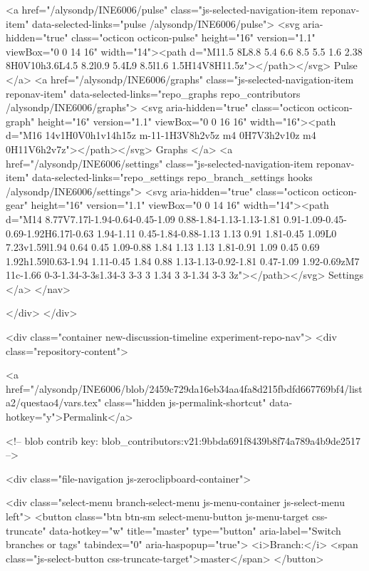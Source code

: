   <a href="/alysondp/INE6006/pulse" class="js-selected-navigation-item reponav-item" data-selected-links="pulse /alysondp/INE6006/pulse">
    <svg aria-hidden="true" class="octicon octicon-pulse" height="16" version="1.1" viewBox="0 0 14 16" width="14"><path d="M11.5 8L8.8 5.4 6.6 8.5 5.5 1.6 2.38 8H0V10h3.6L4.5 8.2l0.9 5.4L9 8.5l1.6 1.5H14V8H11.5z"></path></svg>
    Pulse
</a>
  <a href="/alysondp/INE6006/graphs" class="js-selected-navigation-item reponav-item" data-selected-links="repo_graphs repo_contributors /alysondp/INE6006/graphs">
    <svg aria-hidden="true" class="octicon octicon-graph" height="16" version="1.1" viewBox="0 0 16 16" width="16"><path d="M16 14v1H0V0h1v14h15z m-11-1H3V8h2v5z m4 0H7V3h2v10z m4 0H11V6h2v7z"></path></svg>
    Graphs
</a>
    <a href="/alysondp/INE6006/settings" class="js-selected-navigation-item reponav-item" data-selected-links="repo_settings repo_branch_settings hooks /alysondp/INE6006/settings">
      <svg aria-hidden="true" class="octicon octicon-gear" height="16" version="1.1" viewBox="0 0 14 16" width="14"><path d="M14 8.77V7.17l-1.94-0.64-0.45-1.09 0.88-1.84-1.13-1.13-1.81 0.91-1.09-0.45-0.69-1.92H6.17l-0.63 1.94-1.11 0.45-1.84-0.88-1.13 1.13 0.91 1.81-0.45 1.09L0 7.23v1.59l1.94 0.64 0.45 1.09-0.88 1.84 1.13 1.13 1.81-0.91 1.09 0.45 0.69 1.92h1.59l0.63-1.94 1.11-0.45 1.84 0.88 1.13-1.13-0.92-1.81 0.47-1.09 1.92-0.69zM7 11c-1.66 0-3-1.34-3-3s1.34-3 3-3 3 1.34 3 3-1.34 3-3 3z"></path></svg>
      Settings
</a>
</nav>

  </div>
</div>

<div class="container new-discussion-timeline experiment-repo-nav">
  <div class="repository-content">

    

<a href="/alysondp/INE6006/blob/2459c729da16eb34aa4fa8d215fbdfd667769bf4/lista2/questao4/vars.tex" class="hidden js-permalink-shortcut" data-hotkey="y">Permalink</a>

<!-- blob contrib key: blob_contributors:v21:9bbda691f8439b8f74a789a4b9de2517 -->

<div class="file-navigation js-zeroclipboard-container">
  
<div class="select-menu branch-select-menu js-menu-container js-select-menu left">
  <button class="btn btn-sm select-menu-button js-menu-target css-truncate" data-hotkey="w"
    title="master"
    type="button" aria-label="Switch branches or tags" tabindex="0" aria-haspopup="true">
    <i>Branch:</i>
    <span class="js-select-button css-truncate-target">master</span>
  </button>

